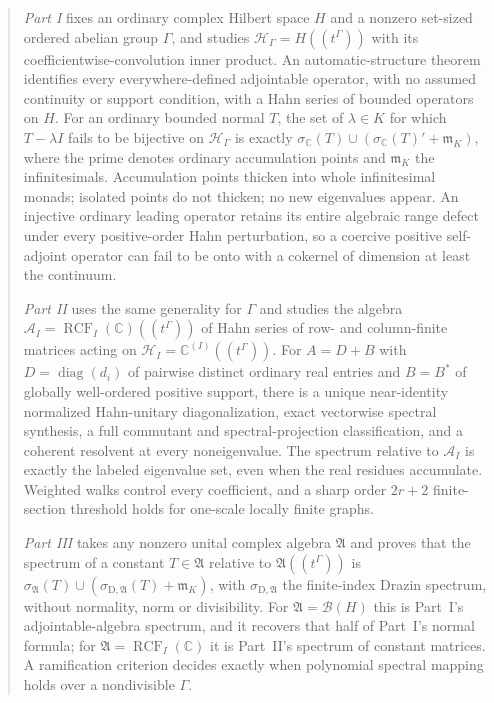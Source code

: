 \documentclass[11pt,a4paper]{article}
\numberwithin{equation}{section}
\theoremstyle{definition}
\theoremstyle{remark}
\newcommand{\C}{\mathbb C}
\newcommand{\K}{K}
\newcommand{\mK}{\mathfrak m_K}
\newcommand{\Hil}{\mathcal H_\Gamma}
\newcommand{\Hrf}{\mathcal H_I}
\newcommand{\Arf}{\mathcal A_I}
\newcommand{\diag}{\operatorname{diag}}
\newcommand{\RCF}{\operatorname{RCF}}
\newcommand{\Alg}{\mathfrak A}
\begin{document}
\begin{titlepage}
\begin{minipage}{.97\textwidth}
\begin{abstract}
\emph{Part I} fixes an ordinary complex Hilbert space $H$ and a nonzero
set-sized ordered abelian group $\Gamma$, and studies
$\Hil=H((t^\Gamma))$ with its coefficientwise-convolution inner product.
An automatic-structure theorem identifies every everywhere-defined
adjointable operator, with no assumed continuity or support condition, with
a Hahn series of bounded operators on $H$. For an ordinary bounded normal
$T$, the set of $\lambda\in\K$ for which $T-\lambda I$ fails to be bijective
on $\Hil$ is exactly $\sigma_\C(T)\cup(\sigma_\C(T)'+\mK)$, where the prime
denotes ordinary accumulation points and $\mK$ the infinitesimals.
Accumulation points thicken into whole infinitesimal monads; isolated points
do not thicken; no new eigenvalues appear. An injective ordinary leading
operator retains its entire algebraic range defect under every
positive-order Hahn perturbation, so a coercive positive self-adjoint
operator can fail to be onto with a cokernel of dimension at least the
continuum.

\emph{Part II} uses the same generality for $\Gamma$ and studies the algebra $\Arf=\RCF_I(\C)((t^\Gamma))$ of Hahn
series of row- and column-finite matrices acting on
$\Hrf=\C^{(I)}((t^\Gamma))$. For $A=D+B$ with $D=\diag(d_i)$ of pairwise
distinct ordinary real entries and $B=B^*$ of globally well-ordered positive
support, there is a unique near-identity normalized Hahn-unitary
diagonalization, exact vectorwise spectral synthesis, a full commutant and
spectral-projection classification, and a coherent resolvent at every
noneigenvalue. The spectrum relative to $\Arf$ is exactly the labeled
eigenvalue set, even when the real residues accumulate. Weighted walks
control every coefficient, and a sharp order $2r+2$ finite-section threshold
holds for one-scale locally finite graphs.

\emph{Part III} takes any nonzero unital complex algebra $\Alg$ and proves
that the spectrum of a constant $T\in\Alg$ relative to $\Alg((t^\Gamma))$ is
$\sigma_\Alg(T)\cup(\sigma_{\mathrm D,\Alg}(T)+\mK)$, with
$\sigma_{\mathrm D,\Alg}$ the finite-index Drazin spectrum, without
normality, norm or divisibility. For $\Alg=\mathcal B(H)$ this is Part~I's
adjointable-algebra spectrum, and it recovers that half of Part~I's normal
formula; for $\Alg=\RCF_I(\C)$ it is Part~II's spectrum of constant
matrices. A ramification criterion decides exactly when polynomial spectral
mapping holds over a nondivisible $\Gamma$.


\end{abstract}
\end{minipage}
\end{titlepage}
\end{document}
